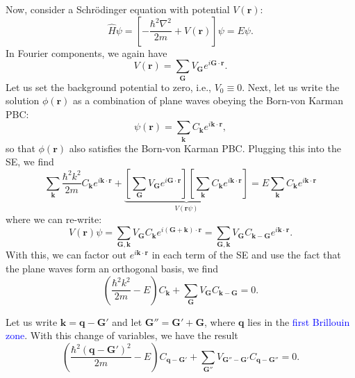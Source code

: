 \documentclass{book}
\theoremstyle{definition}
\newcommand{\f}[2]{\frac{#1}{#2}}
\newcommand{\lp}{\left(}
\newcommand{\rp}{\right)}
\newcommand{\lb}{\left[}
\newcommand{\rb}{\right]}
\begin{document}
Now, consider a Schr\"{o}dinger equation with potential $V(\mathbf{r})$:
\begin{equation*}
\widehat{H}\psi = \lb -\f{\hbar^2 \nabla^2}{2m} + V(\mathbf{r}) \rb \psi = E\psi.
\end{equation*}
In Fourier components, we again have
\begin{equation*}
V(\mathbf{r}) = \sum_\mathbf{G} V_\mathbf{G} e^{i\mathbf{G}\cdot \mathbf{r}}.
\end{equation*}
Let us set the background potential to zero, i.e., $V_0 \equiv 0$. Next, let us write the solution $\phi(\mathbf{r})$ as a combination of plane waves obeying the Born-von Karman PBC:
\begin{equation*}
\psi(\mathbf{r}) = \sum_\mathbf{k}C_\mathbf{k} e^{i\mathbf{k}\cdot \mathbf{r}},
\end{equation*}
so that $\phi(\mathbf{r})$ also satisfies the Born-von Karman PBC. Plugging this into the SE, we find 
\begin{equation*}
\sum_\mathbf{k} \f{\hbar^2k^2}{2m} C_\mathbf{k} e^{i\mathbf{k}\cdot \mathbf{r}} + \underbrace{\lb \sum_\mathbf{G} V_\mathbf{G} e^{i\mathbf{G}\cdot \mathbf{r}} \rb \lb \sum_\mathbf{k} C_\mathbf{k} e^{i\mathbf{k}\cdot \mathbf{r}} \rb}_{V(\mathbf{r}\psi)} = E\sum_\mathbf{k} C_\mathbf{k} e^{i\mathbf{k}\cdot \mathbf{r}}
\end{equation*}
where we can re-write:
\begin{equation*}
V(\mathbf{r})\psi = \sum_{\mathbf{G},\mathbf{k}} V_\mathbf{G}C_\mathbf{k} e^{i(\mathbf{G}+ \mathbf{k})\cdot \mathbf{r}}  = \sum_{\mathbf{G},\mathbf{k}} V_\mathbf{G}C_{\mathbf{k}-\mathbf{G}} e^{i\mathbf{k}\cdot \mathbf{r}}.
\end{equation*}
With this, we can factor out $e^{i\mathbf{k}\cdot \mathbf{r}}$ in each term of the SE and use the fact that the plane waves form an orthogonal basis, we find 
\begin{equation*}
\lp \f{\hbar^2k^2}{2m} - E \rp C_\mathbf{k} + \sum_\mathbf{G} V_\mathbf{G} C_{\mathbf{k}-\mathbf{G}} = 0.
\end{equation*}

Let us write $\mathbf{k} = \mathbf{q} - \mathbf{G}'$ and let $\mathbf{G}'' = \mathbf{G}' + \mathbf{G}$, where $\mathbf{q}$ lies in the \textcolor{blue}{first Brillouin zone}. With this change of variables, we have the result
\begin{equation*}
\lp \f{\hbar^2 (\mathbf{q} - \mathbf{G}')^2}{2m} - E \rp C_{\mathbf{q} - \mathbf{G}'} + \sum_{\mathbf{G}''}V_{\mathbf{G}'' - \mathbf{G}'}C_{\mathbf{q} - \mathbf{G}''} = 0.
\end{equation*}
\end{document}
